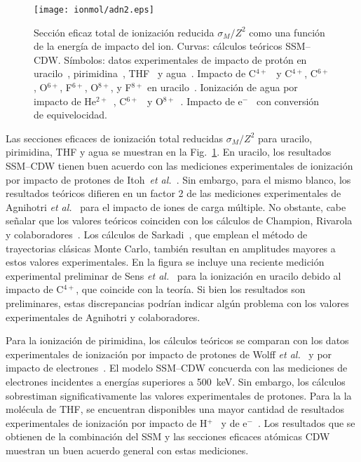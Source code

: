 \begin{figure}
\centering
\texttt{[image: ionmol/adn2.eps]}
\caption[Sección eficaz total de ionización reducida por $Z$ 
(Parte II).]
{Sección eficaz total de ionización reducida $\sigma_{M}/Z^2$ como 
una función de la energía de impacto del ion. 
Curvas: cálculos teóricos SSM--CDW. 
Símbolos: datos experimentales de impacto de protón en 
uracilo~\cite{itoh2013}, 
pirimidina~\cite{wolff2014}, THF~\cite{wang2016} y agua~\cite{Luna2007,
Bolorizadeh86,H_Rudd85,toburen80}. Impacto de C$^{4+}$~\cite{Sens:20} y 
C$^{4+}$, C$^{6+}$, O$^{6+}$, F$^{6+}$, O$^{8+}$, y F$^{8+}$ en 
uracilo~\cite{agnihotri2012,agnihotri2013}. Ionización de agua por 
impacto de He$^{2+}$~\cite{Ohsawa05,He_Rudd85,toburen80}, 
C$^{6+}$~\cite{DalCappello:09,Bhattacharjee:17} y 
O$^{8+}$~\cite{Bhattacharjee:16}. 
Impacto de e$^-$~\cite{bug2017,wolf2019,fuss2009} con conversión de 
equivelocidad.}
\label{fig:crossDNA_2}
\end{figure} 

Las secciones eficaces de ionización total reducidas $\sigma_M/Z^2$ 
para uracilo, pirimidina, THF y agua se muestran en la 
Fig.~\ref{fig:crossDNA_2}. En uracilo, los resultados SSM--CDW tienen 
buen acuerdo con las mediciones experimentales de ionización por impacto 
de protones de Itoh~\textit{et al.}~\cite{itoh2013}. Sin embargo, para 
el mismo blanco, los resultados teóricos difieren en un factor 2 de las 
mediciones experimentales de 
Agnihotri \textit{et al.}~\cite{agnihotri2012,agnihotri2013} para el 
impacto de iones de carga múltiple. No obstante, cabe señalar que los 
valores teóricos coinciden con los cálculos de Champion, 
Rivarola y colaboradores~\cite{agnihotri2012,champion2012}. Los cálculos 
de Sarkadi~\cite{sarkadi2016}, que emplean el método de trayectorias 
clásicas Monte Carlo, también resultan en amplitudes mayores a estos 
valores experimentales. En la figura se incluye una reciente medición 
experimental preliminar de Sens \textit{et al.}~\cite{Sens:20} para la 
ionización en uracilo debido al impacto de C$^{4+}$, que coincide con la 
teoría. Si bien los resultados son preliminares, estas discrepancias 
podrían indicar algún problema con los valores experimentales de 
Agnihotri y colaboradores. 

Para la ionización de pirimidina, los cálculos teóricos se comparan con 
los datos experimentales de ionización por impacto de protones de Wolff 
\textit{et al.}~\cite{wolff2014} y por impacto de 
electrones~\cite{bug2017}. El modelo SSM--CDW concuerda con las 
mediciones de electrones incidentes a energías superiores a 500~keV. Sin 
embargo, los cálculos sobrestiman significativamente las valores 
experimentales de protones. Para la la molécula de THF, se encuentran 
disponibles una mayor cantidad de resultados experimentales de 
ionización por impacto de H$^+$~\cite{wang2016} y de 
e$^-$~\cite{bug2017,wolf2019,fuss2009}. Los resultados que se obtienen 
de la combinación del SSM y las secciones eficaces atómicas CDW muestran 
un buen acuerdo general con estas mediciones.


